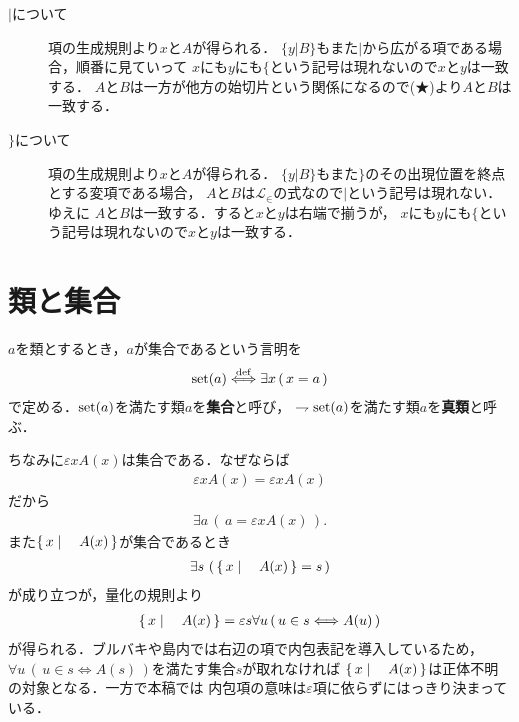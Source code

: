 \begin{description}
		\item[$|$について]
			項の生成規則より$x$と$A$が得られる．
			$\{y|B\}$もまた$|$から広がる項である場合，順番に見ていって
			$x$にも$y$にも$\{$という記号は現れないので$x$と$y$は一致する．
			$A$と$B$は一方が他方の始切片という関係になるので(★)より$A$と$B$は一致する．
			
		\item[$\}$について]
			項の生成規則より$x$と$A$が得られる．
			$\{y|B\}$もまた$\}$のその出現位置を終点とする変項である場合，
			$A$と$B$は$\mathcal{L}_{\in}$の式なので$|$という記号は現れない．ゆえに
			$A$と$B$は一致する．すると$x$と$y$は右端で揃うが，
			$x$にも$y$にも$\{$という記号は現れないので$x$と$y$は一致する．
	\end{description}
	
\section{類と集合}
	\begin{screen}
		\begin{dfn}[類と集合]
			$a$を類とするとき，$a$が集合であるという言明を
			\begin{align}
				\operatorname*{set} (a) \overset{\mathrm{def}}{\Longleftrightarrow} \exists x\, (\, x = a\, )
			\end{align}
			で定める．$\operatorname*{set} (a)$を満たす類$a$を{\bf 集合}と呼び，
			$\rightharpoondown \operatorname*{set} (a)$を満たす類$a$を{\bf 真類}と呼ぶ．
		\end{dfn}
	\end{screen}
	
	ちなみに$\varepsilon x A(x)$は集合である．なぜならば
	\begin{align}
		\varepsilon x A(x) = \varepsilon x A(x)
	\end{align}
	だから
	\begin{align}
		\exists a\, \left(\, a = \varepsilon x A(x)\, \right).
	\end{align}
	また$\left\{\, x \mid \quad A(x)\, \right\}$が集合であるとき
	\begin{align}
		\exists s\, \left(\, \left\{\, x \mid \quad A(x)\, \right\} = s\, \right)
	\end{align}
	が成り立つが，量化の規則より
	\begin{align}
		\left\{\, x \mid \quad A(x)\, \right\} = \varepsilon s \forall u\, (\, u \in s \Longleftrightarrow A(u)\, )
	\end{align}
	が得られる．ブルバキや島内では右辺の項で内包表記を導入しているため，
	$\forall u\, (\, u \in s \Longleftrightarrow A(s)\, )$を満たす集合$s$が取れなければ
	$\left\{\, x \mid \quad A(x)\, \right\}$は正体不明の対象となる．一方で本稿では
	内包項の意味は$\varepsilon$項に依らずにはっきり決まっている．
	
